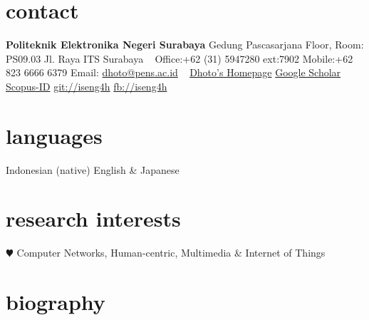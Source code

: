 \documentclass[style=verbose,maxnames=99,sorting=ydnt,style=verbose,maxnames=99,sorting=ydnt,backend=biber]{friggeri-cv} %
\begin{document}


\begin{aside} %
\section{contact}
\textbf{Politeknik Elektronika Negeri Surabaya}
Gedung Pascasarjana  Floor, Room: PS09.03
Jl. Raya ITS Surabaya
~
Office:+62 (31) 5947280 ext:7902
Mobile:+62 823 6666 6379
Email: \href{mailto:dhoto@pens.ac.id}{dhoto@pens.ac.id}
~
\href{http://dhoto.lecturer.pens.ac.id/}{Dhoto's Homepage}
\href{https://scholar.google.co.id/citations?user=M6sGfNQAAAAJ&hl=en&oi=ao}{Google Scholar}
\href{https://www.scopus.com/authid/detail.uri?authorId=35100882700}{Scopus-ID}
\href{http://github.com/iseng4h}{git://iseng4h}
\href{http://facebook.com/iseng4h}{fb://iseng4h}
\section{languages}
Indonesian (native)
English \& Japanese 
\section{research interests}
{\color{red} $\varheartsuit$} Computer Networks,
Human-centric, Multimedia \& Internet of Things
\end{aside}


\section{biography}
\end{document}

